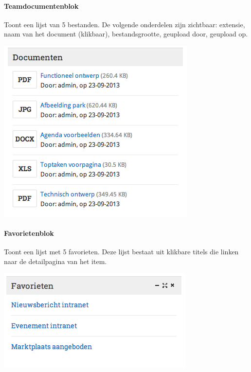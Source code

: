 \paragraph{Teamdocumentenblok}

Toont een lijst van 5 bestanden. De volgende onderdelen zijn zichtbaar: extensie, naam van het document (klikbaar), bestandsgrootte, geupload door, geupload op.

\begin{center}
	\includegraphics[scale=0.5]{img/blokken/teamdocumenten.png}
\end{center}

\paragraph{Favorietenblok}

Toont een lijst met 5 favorieten. Deze lijst bestaat uit klikbare titels die linken naar de detailpagina van het item.

\begin{center}
	\includegraphics[scale=0.5]{img/blokken/favorieten.png}
\end{center}

